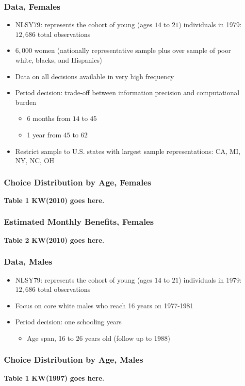 \begin{frame}
	\frametitle{Data, Females}
		\begin{itemize}
			\item NLSY79: represents the cohort of young (ages $14$ to $21$) individuals in 1979: $12,686$ total observations 
			\item $6,000$ women (nationally representative sample plus over sample of poor white, blacks, and Hispanics)
			\item Data on all decisions available in very high frequency
			\item Period decision: trade-off between information precision and computational burden
			\begin{itemize}
				\item 6 months from $14$ to $45$
				\item 1 year from $45$ to $62$
			\end{itemize}						
			\item Restrict sample to U.S. states with largest sample representations: CA, MI, NY, NC, OH
		\end{itemize}
\end{frame}

\begin{frame}
	\frametitle{Choice Distribution by Age, Females}
	\textbf{Table 1 KW(2010) goes here.}
\end{frame}

\begin{frame}
	\frametitle{Estimated Monthly Benefits, Females}
	\textbf{Table 2 KW(2010) goes here.}
\end{frame}

\begin{frame}
	\frametitle{Data, Males}
		\begin{itemize}
			\item NLSY79: represents the cohort of young (ages $14$ to $21$) individuals in 1979: $12,686$ total observations
			\item Focus on core white males who reach 16 years on 1977-1981
			\item Period decision: one schooling years
			\begin{itemize}
				\item Age span, 16 to 26 years old (follow up to 1988)
			\end{itemize}						
		\end{itemize}
\end{frame}

\begin{frame}
	\frametitle{Choice Distribution by Age, Males}
	\textbf{Table 1 KW(1997) goes here.}
\end{frame}


